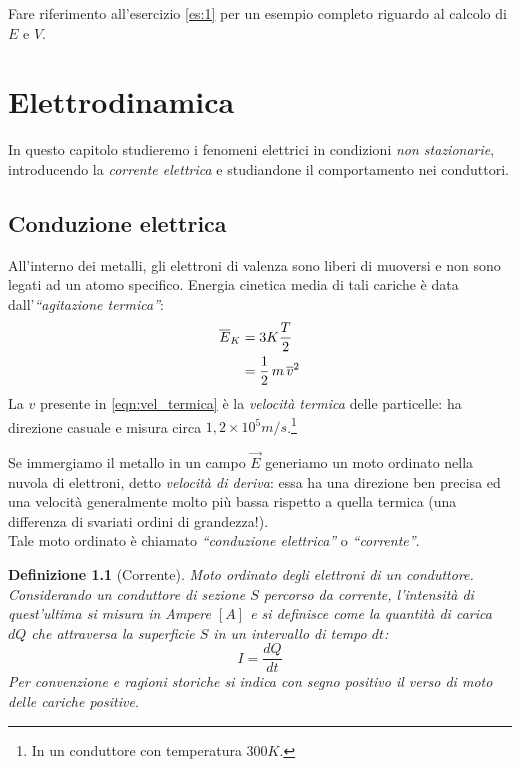 \documentclass[a4paper,12pt,titlepage,openany]{book}
\theoremstyle{mydef}
\newtheorem{definizione}{Definizione}[chapter]
\begin{document}
            \bigskip\noindent
            Fare riferimento all'esercizio \ref{es:1} per un esempio completo riguardo al calcolo di $E$ e $V$.
            
    \chapter{Elettrodinamica}
        In questo capitolo studieremo i fenomeni elettrici in condizioni \emph{non stazionarie}, introducendo la \emph{corrente elettrica} e studiandone il comportamento nei conduttori.
        
        \section{Conduzione elettrica}
            All'interno dei metalli, gli elettroni di valenza sono liberi di muoversi e non sono legati ad un atomo
            specifico. Energia cinetica media di tali cariche è data dall'\emph{``agitazione termica''}:
            \begin{align}
                \overline{E}_K &= 3K\frac{T}{2} \notag \\
                &= \frac{1}{2}\,m\,\overline{v}^2 \label{eqn:vel_termica}
            \end{align}
            La $v$ presente in \ref{eqn:vel_termica} è la \emph{velocità termica} delle particelle: ha direzione casuale
            e misura circa $1,2\times 10^5 m/s$.\footnote{In un conduttore con temperatura $300K$.}
            
            Se immergiamo il metallo in un campo $\vec{E}$ generiamo un moto ordinato nella nuvola di elettroni,
            detto \emph{velocità di deriva}: essa ha una direzione ben precisa ed una velocità generalmente molto
            più bassa rispetto a quella termica (una differenza di svariati ordini di grandezza!).\\
            Tale moto ordinato è chiamato \emph{``conduzione elettrica''} o \emph{``corrente''}.
            
            \begin{definizione}[Corrente]
                Moto ordinato degli elettroni di un conduttore. Considerando un conduttore di sezione $S$ percorso da
                corrente, l'intensità di quest'ultima si misura in \emph{Ampere} $[A]$ e si definisce come la quantità
                di carica $dQ$ che attraversa la superficie $S$ in un intervallo di tempo $dt$:
                \begin{equation}
                    \boxed{I = \frac{dQ}{dt}}
                \end{equation}
                Per convenzione e ragioni storiche si indica con segno positivo il verso di moto delle cariche positive.
            \end{definizione}
            
\end{document}
